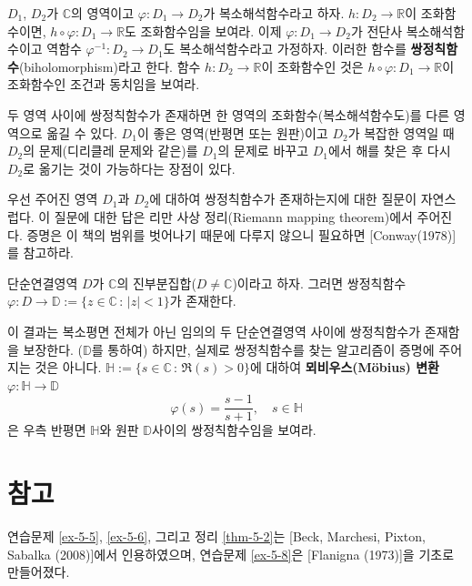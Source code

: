 \begin{salt_exercise}\label{ex-5-11}
$D_1$, $D_2$가 $\mathbb C$의 영역이고
$\varphi: D_1 \to D_2$가 복소해석함수라고 하자.
$h:D_2\to \mathbb R$이 조화함수이면,
$h\circ \varphi : D_1 \to \mathbb R$도 조화함수임을 보여라.
이제 $\varphi: D_1 \to D_2$가 전단사 복소해석함수이고
역함수 $\varphi^{-1}: D_2 \to D_1$도 복소해석함수라고 가정하자.
이러한 함수를 {\bf 쌍정칙함수}(biholomorphism)라고 한다.
함수 $h:D_2\to \mathbb R$이 조화함수인 것은
$h\circ \varphi : D_1 \to \mathbb R$이 조화함수인 조건과 동치임을 보여라.

두 영역 사이에 쌍정칙함수가 존재하면
한 영역의 조화함수(복소해석함수도)를 다른 영역으로 옮길 수 있다.
$D_1$이 좋은 영역(반평면 또는 원판)이고 $D_2$가 복잡한 영역일 때
$D_2$의 문제(디리클레 문제와 같은)를 $D_1$의 문제로 바꾸고
$D_1$에서 해를 찾은 후 다시 $D_2$로 옮기는 것이 가능하다는 장점이 있다.

우선 주어진 영역 $D_1$과 $D_2$에 대하여
쌍정칙함수가 존재하는지에 대한 질문이 자연스럽다.
이 질문에 대한 답은 리만 사상 정리(Riemann mapping theorem)에서 주어진다.
증명은 이 책의 범위를 벗어나기 때문에 다루지 않으니
필요하면 [Conway(1978)]를 참고하라.


\begin{salt_theorem}[리만 사상 정리] \label{thm-5-5}
 단순연결영역 $D$가 $\mathbb C$의 진부분집합($D\ne \mathbb C$)이라고 하자.
 그러면 쌍정칙함수 $\varphi: D\to \mathbb D:=\{z\in\mathbb C\,:\, |z|<1\}$가
 존재한다.
\end{salt_theorem}

이 결과는 복소평면 전체가 아닌 임의의 두 단순연결영역 사이에
쌍정칙함수가 존재함을 보장한다. ($\mathbb D$를 통하여)
하지만, 실제로 쌍정칙함수를 찾는 알고리즘이 증명에 주어지는 것은 아니다.
$\mathbb H:= \{s\in\mathbb C\,:\, \Re(s) >0 \}$에 대하여
{\bf 뫼비우스(M\"obius) 변환} $\varphi: \mathbb H \to \mathbb D$
\[ 
\varphi(s) = \dfrac{s-1}{s+1},
\quad s\in \mathbb H
\]
은 우측 반평면 $\mathbb H$와 원판  $\mathbb D$사이의 쌍정칙함수임을 보여라.
\end{salt_exercise}

\section{참고}

연습문제 \ref{ex-5-5}, \ref{ex-5-6}, 그리고 정리 \ref{thm-5-2}는
[Beck, Marchesi, Pixton, Sabalka (2008)]에서 인용하였으며,
연습문제 \ref{ex-5-8}은 [Flanigna (1973)]을 기초로 만들어졌다.

